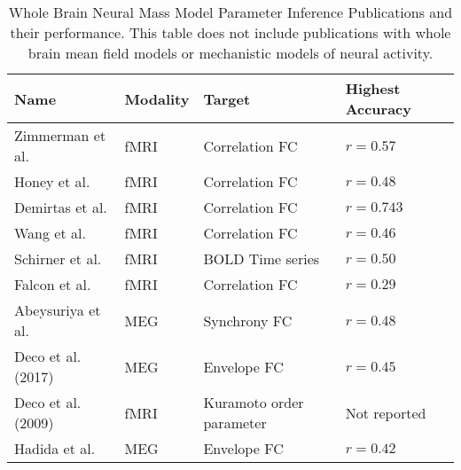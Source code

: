 \begin{table}
 \caption{Whole Brain Neural Mass Model Parameter Inference Publications and their performance. This table does not include publications with whole brain mean field models or mechanistic models of neural activity. }
  \centering
  \begin{tabular}{llll}
    \toprule
    \cmidrule(r){1-2}
    Name & Modality  & Target  & Highest Accuracy \\
    \midrule
    Zimmerman et al. \cite{Zimmermann2018} & fMRI & Correlation FC & $r=0.57$  \\
    Honey et al. \cite{honey_predicting_2009} & fMRI & Correlation FC & $ r=0.48$ \\
    Demirtas et al. \cite{demirtas_hierarchical_2019} & fMRI & Correlation FC & $r=0.743$ \\
    Wang et al. \cite{wang_inversion_2019} & fMRI & Correlation FC & $r=0.46$ \\
    Schirner et al. \cite{schirner_inferring_2018} & fMRI & BOLD Time series & $r=0.50$ \\
    Falcon et al. \cite{falcon_virtual_2015} & fMRI  & Correlation FC  &  $r = 0.29$  \\
    Abeysuriya et al. \cite{abeysuriya_biophysical_2018} & MEG & Synchrony FC & $r = 0.48$ \\
    Deco et al. (2017) \cite{deco_single_2017}  & MEG & Envelope FC & $r=0.45$ \\
    Deco et al. (2009) \cite{Deco2009} & fMRI & Kuramoto order parameter & Not reported \\
    Hadida et al. \cite{hadida_bayesian_2018} & MEG & Envelope FC & $r=0.42$ \\
    \bottomrule
  \end{tabular}
  \label{tab:nmm_pubs}
\end{table}
